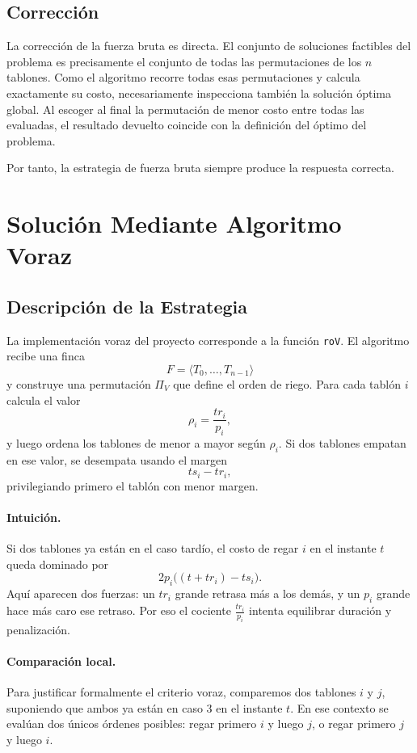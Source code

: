 \documentclass[12pt,a4paper]{article}
\begin{document}
\subsection{Correcci\'on}

La correcci\'on de la fuerza bruta es directa. El conjunto de soluciones factibles del problema es precisamente el conjunto de todas las permutaciones de los \(n\) tablones. Como el algoritmo recorre todas esas permutaciones y calcula exactamente su costo, necesariamente inspecciona tambi\'en la soluci\'on \'optima global. Al escoger al final la permutaci\'on de menor costo entre todas las evaluadas, el resultado devuelto coincide con la definici\'on del \'optimo del problema.

Por tanto, la estrategia de fuerza bruta siempre produce la respuesta correcta.

\section{Soluci\'on Mediante Algoritmo Voraz}

\subsection{Descripci\'on de la Estrategia}

La implementaci\'on voraz del proyecto corresponde a la funci\'on \texttt{roV}. El algoritmo recibe una finca
\[
F=\langle T_0,\dots,T_{n-1}\rangle
\]
y construye una permutaci\'on \(\Pi_V\) que define el orden de riego. Para cada tabl\'on \(i\) calcula el valor
\[
\rho_i=\frac{tr_i}{p_i},
\]
y luego ordena los tablones de menor a mayor seg\'un \(\rho_i\). Si dos tablones empatan en ese valor, se desempata usando el margen
\[
ts_i - tr_i,
\]
privilegiando primero el tabl\'on con menor margen.

\paragraph{Intuici\'on.}
Si dos tablones ya est\'an en el caso tard\'io, el costo de regar \(i\) en el instante \(t\) queda dominado por
\[
2p_i\bigl((t+tr_i)-ts_i\bigr).
\]
Aqu\'i aparecen dos fuerzas: un \(tr_i\) grande retrasa m\'as a los dem\'as, y un \(p_i\) grande hace m\'as caro ese retraso. Por eso el cociente \(\frac{tr_i}{p_i}\) intenta equilibrar duraci\'on y penalizaci\'on.

\paragraph{Comparaci\'on local.}
Para justificar formalmente el criterio voraz, comparemos dos tablones \(i\) y \(j\), suponiendo que ambos ya est\'an en caso 3 en el instante \(t\). En ese contexto se eval\'uan dos \'unicos \'ordenes posibles: regar primero \(i\) y luego \(j\), o regar primero \(j\) y luego \(i\).
\end{document}

